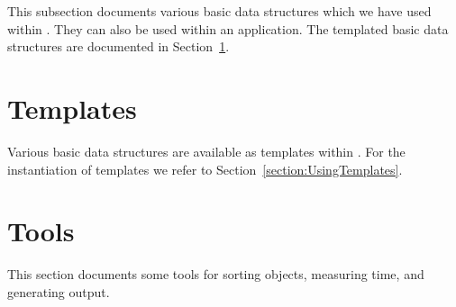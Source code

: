 This subsection documents various basic data structures which we have used
within \ABACUS. They can also be used within an application. The
templated basic data structures are documented in 
Section~\ref{section:ReferenceTemplates}.









\section{Templates}
\label{section:ReferenceTemplates}

Various basic data structures are available as templates within
\ABACUS. For the instantiation of templates we refer to 
Section~\ref{section:UsingTemplates}.

























\section{Tools}

This section documents some tools for sorting objects, measuring time,
and generating output.









